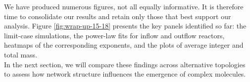 \documentclass[11pt]{article}
\begin{document}
We have produced numerous figures, not all equally informative. It is therefore time to consolidate our results and retain only those that best support our analysis. Figure \ref{fig:wrap-up-15-18} presents the key panels identified so far: the limit-case simulations, the power-law fits for inflow and outflow reactors, heatmaps of the corresponding exponents, and the plots of average integer and total mass.\\

In the next section, we will compare these findings across alternative topologies to assess how network structure influences the emergence of complex molecules.\\

\clearpage

\end{document}
